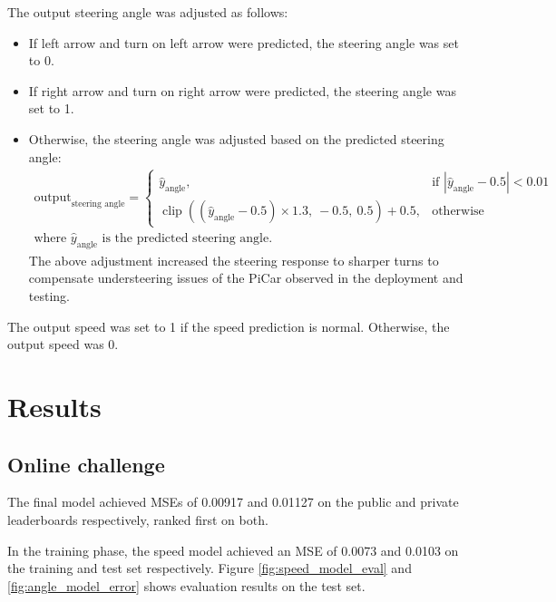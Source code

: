 \documentclass{article}
\begin{document}
The output steering angle was adjusted as follows:
\begin{itemize}
  \item If left arrow and turn on left arrow were predicted, the steering angle was set to 0.
  \item If right arrow and turn on right arrow were predicted, the steering angle was set to 1.
  \item Otherwise, the steering angle was adjusted based on the predicted steering angle:
        \begin{equation}
          \begin{aligned}
            \text{output}_{\text{steering angle}} =
            \begin{cases}
              \hat{y}_{\text{angle}},                                                                    & \text{if } \left| \hat{y}_{\text{angle}} - 0.5 \right| < 0.01 \\
              \operatorname{clip}\left( (\hat{y}_{\text{angle}} - 0.5) \times 1.3,\ -0.5,\ 0.5 \right) + 0.5, & \text{otherwise}
            \end{cases}
            \\
            \text{where } \hat{y}_{\text{angle}} \text{ is the predicted steering angle.}
          \end{aligned}
        \end{equation}
        The above adjustment increased the steering response to sharper turns to compensate understeering issues of the PiCar observed in the deployment and testing.
\end{itemize}
The output speed was set to 1 if the speed prediction is normal. Otherwise, the output speed was 0.


\section{Results}

\subsection{Online challenge}
The final model achieved MSEs of 0.00917 and 0.01127 on the public and private leaderboards respectively, ranked first on both.

In the training phase, the speed model achieved an MSE of 0.0073 and 0.0103 on the training and test set respectively. Figure \ref{fig:speed_model_eval} and \ref{fig:angle_model_error} shows evaluation results on the test set.
\end{document}

